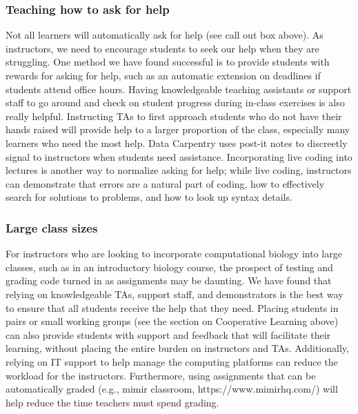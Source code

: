 \subsubsection{Teaching how to ask for help}
Not all learners will automatically ask for help (see call out box above). 
As instructors, we need to encourage students to seek our help when they are struggling.
One method we have found successful is to provide students with rewards for asking for help, such as an automatic extension on deadlines if students attend office hours.
Having knowledgeable teaching assistants or support staff to go around and check on student progress during in-class exercises is also really helpful.
Instructing TAs to first approach students who do not have their hands raised will provide help to a larger proportion of the class, especially many learners who need the most help.
Data Carpentry uses post-it notes to discreetly signal to instructors when students need assistance.
Incorporating live coding into lectures is another way to normalize asking for help; while live coding, instructors can demonstrate that errors are a natural part of coding, how to effectively search for solutions to problems, and how to look up syntax details.

\subsubsection{Large class sizes}

For instructors who are looking to incorporate computational biology into large classes, such as in an introductory biology course, the prospect of testing and grading code turned in as assignments may be daunting. 
We have found that relying on knowledgeable TAs, support staff, and demonstrators is the best way to ensure that all students receive the help that they need.
Placing students in pairs or small working groups (see the section on Cooperative Learning above) can also provide students with support and feedback that will facilitate their learning, without placing the entire burden on instructors and TAs.
Additionally, relying on IT support to help manage the computing platforms can reduce the workload for the instructors.
Furthermore, using assignments that can be automatically graded (e.g., mimir classroom, https://www.mimirhq.com/) will help reduce the time teachers must spend grading.



